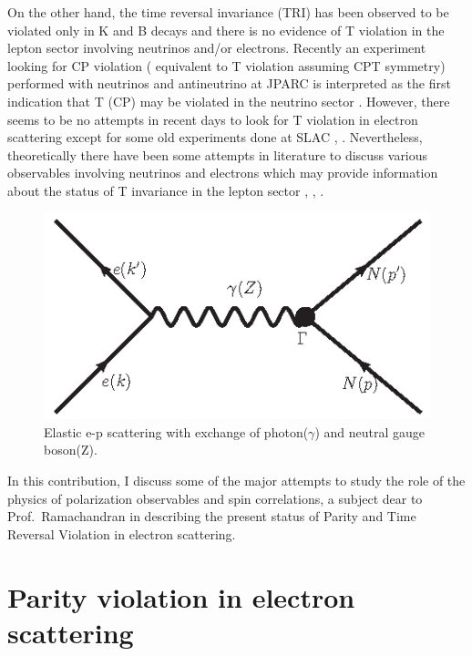 On the other hand, the time reversal invariance (TRI) has been observed to be violated only in K and B decays and there is no evidence of T  violation in the  lepton sector  involving neutrinos and/or  electrons.  Recently an experiment looking for CP  violation ( equivalent to T    violation assuming CPT symmetry) performed with neutrinos and antineutrino at JPARC  is  interpreted as the first indication that T (CP) may be violated in the neutrino sector \cite{chap9-key17}. However,  there seems to be no attempts in recent days to look for T  violation  in electron scattering except for some old experiments done at SLAC \cite{chap9-key18}, \cite{chap9-key19}. Nevertheless, theoretically there have been some attempts in literature to discuss various  observables involving neutrinos and electrons which may provide information about the status of T  invariance in the lepton  sector  \cite{chap9-key14}, \cite{chap9-key15}, \cite{chap9-key21}. 
\medskip

\begin{figure}[H]
\centering
\includegraphics[scale=0.55]{src/images/chap9/fig1.jpg}
\caption{Elastic e-p scattering with exchange of photon($\gamma$) and neutral gauge boson(Z).}\label{chap9-fig1}
\end{figure}
         
In this contribution,  I discuss some of the major  attempts to study the role of the physics of polarization observables and spin correlations, a subject dear to Prof.\ Ramachandran in describing the present status of Parity and Time Reversal Violation in electron scattering.
    
\section{Parity violation in electron scattering}\label{chap9-sec3}
     

